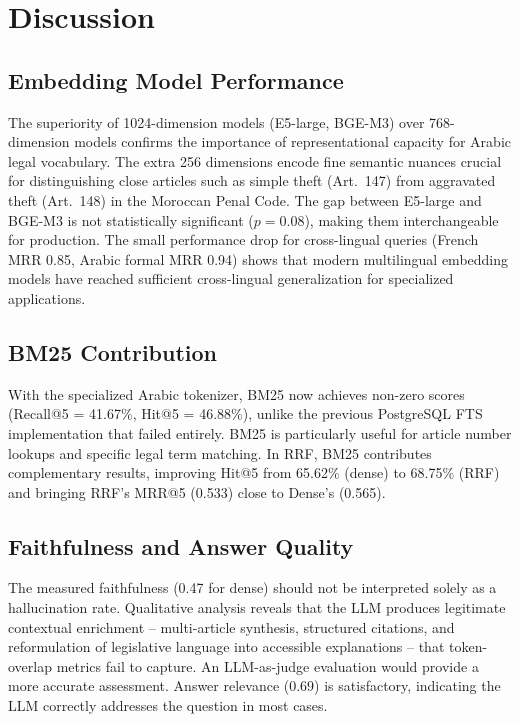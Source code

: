 \section{Discussion}

\subsection{Embedding Model Performance}

The superiority of 1024-dimension models (E5-large, BGE-M3) over 768-dimension
models confirms the importance of representational capacity for Arabic legal
vocabulary. The extra 256 dimensions encode fine semantic nuances crucial for
distinguishing close articles such as simple theft (Art.~147) from aggravated
theft (Art.~148) in the Moroccan Penal Code. The gap between E5-large and
BGE-M3 is not statistically significant ($p = 0.08$), making them
interchangeable for production. The small performance drop for cross-lingual
queries (French MRR 0.85, Arabic formal MRR 0.94) shows that modern
multilingual embedding models have reached sufficient cross-lingual
generalization for specialized applications.

\subsection{BM25 Contribution}

With the specialized Arabic tokenizer, BM25 now achieves non-zero scores
(Recall@5 = 41.67\%, Hit@5 = 46.88\%), unlike the previous PostgreSQL FTS
implementation that failed entirely. BM25 is particularly useful for article
number lookups and specific legal term matching. In RRF, BM25 contributes
complementary results, improving Hit@5 from 65.62\% (dense) to 68.75\% (RRF)
and bringing RRF's MRR@5 (0.533) close to Dense's (0.565).

\subsection{Faithfulness and Answer Quality}

The measured faithfulness (0.47 for dense) should not be interpreted solely
as a hallucination rate. Qualitative analysis reveals that the LLM produces
legitimate contextual enrichment -- multi-article synthesis, structured
citations, and reformulation of legislative language into accessible
explanations -- that token-overlap metrics fail to capture. An
LLM-as-judge evaluation \cite{gao2023faithful} would provide a more
accurate assessment. Answer relevance (0.69) is satisfactory, indicating
the LLM correctly addresses the question in most cases.

